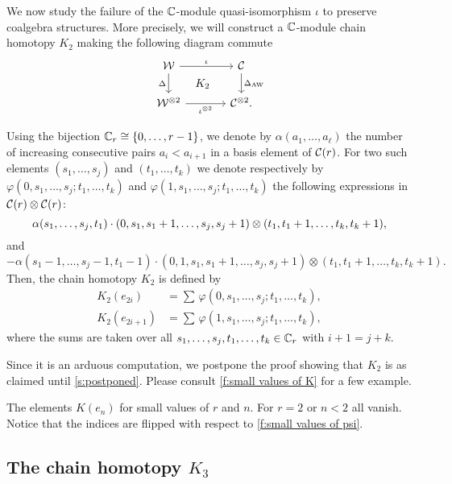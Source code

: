 We now study the failure of the $\mathbb{C}$-module quasi-isomorphism $\iota$ to preserve coalgebra structures.
More precisely, we will construct a $\mathbb{C}$-module chain homotopy $K_2$ making the following diagram commute
\begin{equation}\label{d:coproducts}
	\begin{tikzcd}[column sep=large]
			\cW \arrow[r,"\iota"] \arrow[d,"\Delta"'] \arrow[dr,phantom,"K_2"]&
			\cC \arrow[d,"\Delta_{\AW}"] \\
			\cW^{\ot 2} \arrow[r,"\iota^{\ot 2}"'] &
			\cC^{\ot 2}.
		\end{tikzcd}
\end{equation}

Using the bijection $\mathbb{C}_r \cong \{0,\dots,r-1\}$, we denote by $\alpha(a_1,\dots,a_\ell)$ the number of increasing consecutive pairs $a_i < a_{i+1}$ in a basis element of $\mathcal{C}(r)$.
For two such elements $(s_1,\dots,s_j)$ and $(t_1,\dots,t_k)$ we denote respectively by $\varphi(0,s_1,\dots,s_j;t_1,\dots,t_k)$ and $\varphi(1,s_1,\dots,s_j;t_1,\dots,t_k)$ the following expressions in $\mathcal{C}(r) \otimes \mathcal{C}(r)$:
\[
\alpha(s_1,\dots,s_j,t_1) \cdot
(0,s_1,s_1+1,\dots,s_j,s_j+1) \otimes
(t_1,t_1+1,\dots,t_k,t_k+1),
\]
and
\[
- \alpha(s_1-1,\dots,s_j-1,t_1-1) \cdot
(0,1,s_1,s_1+1,\dots,s_j,s_j+1)\otimes (t_1,t_1+1,\dots,t_k,t_k+1).
\]
Then, the chain homotopy $K_2$ is defined by
\[
\begin{split}
	K_2(e_{2i})   &= \sum \, \varphi(0,s_1,\dots,s_j;t_1,\dots,t_k), \\
	K_2(e_{2i+1}) &= \sum \, \varphi(1,s_1,\dots,s_j;t_1,\dots,t_k),
\end{split}
\]
where the sums are taken over all $s_1,\dots,s_j,t_1,\dots,t_k \in \mathbb{C}_r$ with $i+1 = j+k$.

Since it is an arduous computation, we postpone the proof showing that $K_2$ is as claimed until \cref{s:postponed}.
Please consult \cref{f:small values of K} for a few example.

\begin{table}
	\centering
	
	\caption{The elements $K(e_n)$ for small values of $r$ and $n$. For $r=2$ or $n<2$ all vanish. Notice that the indices are flipped with respect to \cref{f:small values of psi}.}
	\label{f:small values of K}
\end{table}

\subsection{The chain homotopy $K_3$}


